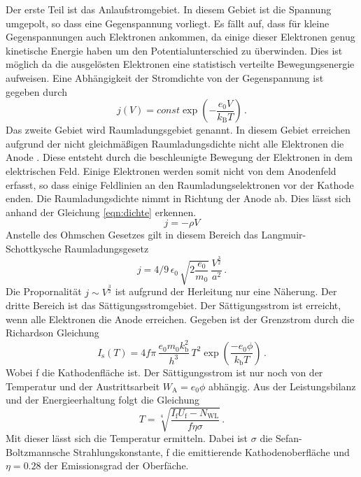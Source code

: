 Der erste Teil ist das Anlaufstromgebiet. In diesem Gebiet ist die Spannung umgepolt, so dass eine Gegenspannung vorliegt.
Es fällt auf, dass für kleine Gegenspannungen auch Elektronen ankommen, da einige dieser Elektronen genug kinetische Energie haben um den Potentialunterschied zu überwinden.
Dies ist möglich da die ausgelösten Elektronen eine statistisch verteilte Bewegungsenergie aufweisen. Eine Abhängigkeit der Stromdichte von der Gegenspannung ist gegeben durch
\begin{equation}
    j(V)=const \exp\left(-\frac{e_0 V}{k_\text{B} T}\right) \, .
    \label{eqn:anlauf}
\end{equation}
Das zweite Gebiet wird Raumladungsgebiet genannt. In diesem Gebiet erreichen aufgrund der nicht gleichmäßigen Raumladungsdichte nicht alle Elektronen die Anode .
Diese entsteht durch die beschleunigte Bewegung der Elektronen in dem elektrischen Feld. Einige Elektronen werden somit nicht von dem Anodenfeld erfasst, so dass einige Feldlinien an den Raumladungselektronen vor der Kathode enden.
Die Raumladungsdichte nimmt in Richtung der Anode ab. Dies lässt sich anhand der Gleichung \eqref{eqn:dichte} erkennen.
\begin{equation}
    j=- \rho V
    \label{eqn:dichte}
\end{equation}
Anstelle des Ohmschen Gesetzes gilt in diesem Bereich das Langmuir-Schottkysche Raumladungsgesetz
\begin{equation}
    j=4/9 \, \epsilon_0\, \sqrt{2 \frac{e_0}{m_0}} \, \frac{V^{\frac{3}{2}}}{a^2} \, .
    \label{eqn:drei halbe}
\end{equation}
Die Propornalität $j \sim V^{\frac{3}{2}}$ ist aufgrund der Herleitung nur eine Näherung.
Der dritte Bereich ist das Sättigungsstromgebiet. Der Sättigungsstrom ist erreicht, wenn alle Elektronen die Anode erreichen. Gegeben ist der Grenzstrom durch die Richardson Gleichung
\begin{equation}
    I_{\text{s}}(T)=4 f \pi\, \frac{e_0 m_0 k_\text{b}^2}{h^3}\, T^2 \exp \left(\frac{-e_0 \phi}{k_\text{b} T}\right) \, .
    \label{eqn:richard}
\end{equation}
Wobei f die Kathodenfläche ist.
Der Sättigungsstrom ist nur noch von der Temperatur und der Austrittsarbeit $W_\text{A}=e_0 \phi$ abhängig.
Aus der Leistungsbilanz und der Energieerhaltung folgt die Gleichung
\begin{equation}
    T=\sqrt[4]{\frac{I_\text{f} U_\text{f}- N_\text{WL}}{f \eta \sigma}} \, .
    \label{eqn:ein viertel}
\end{equation}
Mit dieser lässt sich die Temperatur ermitteln.
Dabei ist $\sigma$ die Sefan-Boltzmannsche Strahlungskonstante, f die emittierende Kathodenoberfläche und $\eta=0.28$ der Emissionsgrad der Oberfäche.